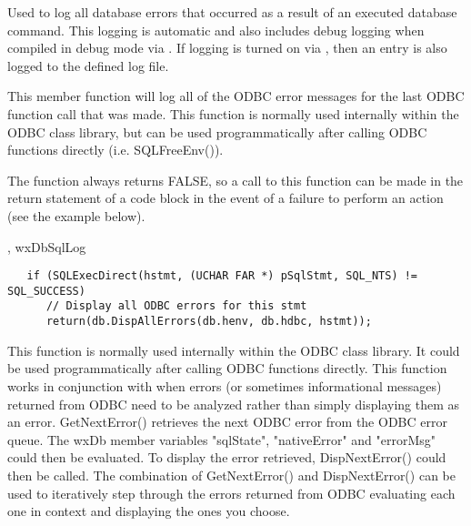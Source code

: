 Used to log all database errors that occurred as a result of an executed 
database command.  This logging is automatic and also includes debug logging 
when compiled in debug mode via .  If logging 
is turned on via , then an 
entry is also logged to the defined log file.






This member function will log all of the ODBC error messages for the last 
ODBC function call that was made.  This function is normally used internally 
within the ODBC class library, but can be used programmatically after calling 
ODBC functions directly (i.e. SQLFreeEnv()).


The function always returns FALSE, so a call to this function can be made 
in the return statement of a code block in the event of a failure to 
perform an action (see the example below).


, wxDbSqlLog


\begin{verbatim}
   if (SQLExecDirect(hstmt, (UCHAR FAR *) pSqlStmt, SQL_NTS) != SQL_SUCCESS)
      // Display all ODBC errors for this stmt
      return(db.DispAllErrors(db.henv, db.hdbc, hstmt));
\end{verbatim}


\label{wxdbdispnexterror}



This function is normally used internally within the ODBC class library.
It could be used programmatically after calling ODBC functions directly.  This
function works in conjunction with  when errors (or
sometimes informational messages)  returned from ODBC need to be analyzed
rather than simply displaying them as an error.  GetNextError() retrieves
the next ODBC error from the ODBC error queue.  The wxDb member variables
"sqlState", "nativeError" and "errorMsg" could then be evaluated.  To
display the error retrieved, DispNextError() could then be called.
The combination of GetNextError() and DispNextError() can be used to
iteratively step through the errors returned from ODBC evaluating each
one in context and displaying the ones you choose.

